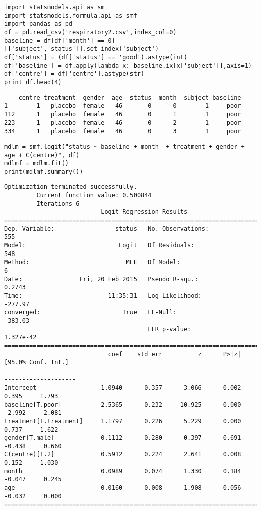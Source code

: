 \documentclass[12pt,fleqn]{article}\usepackage{../common}
\begin{document}
\begin{verbatim}
import statsmodels.api as sm
import statsmodels.formula.api as smf
import pandas as pd
df = pd.read_csv('respiratory2.csv',index_col=0)
baseline = df[df['month'] == 0][['subject','status']].set_index('subject')
df['status'] = (df['status'] == 'good').astype(int)
df['baseline'] = df.apply(lambda x: baseline.ix[x['subject']],axis=1)
df['centre'] = df['centre'].astype(str)
print df.head(4)
\end{verbatim}

\begin{verbatim}
    centre treatment  gender  age  status  month  subject baseline
1        1   placebo  female   46       0      0        1     poor
112      1   placebo  female   46       0      1        1     poor
223      1   placebo  female   46       0      2        1     poor
334      1   placebo  female   46       0      3        1     poor
\end{verbatim}


\begin{verbatim}
mdlm = smf.logit("status ~ baseline + month  + treatment + gender + age + C(centre)", df)
mdlmf = mdlm.fit()
print(mdlmf.summary())
\end{verbatim}

\begin{verbatim}
Optimization terminated successfully.
         Current function value: 0.500844
         Iterations 6
                           Logit Regression Results                           
==============================================================================
Dep. Variable:                 status   No. Observations:                  555
Model:                          Logit   Df Residuals:                      548
Method:                           MLE   Df Model:                            6
Date:                Fri, 20 Feb 2015   Pseudo R-squ.:                  0.2743
Time:                        11:35:31   Log-Likelihood:                -277.97
converged:                       True   LL-Null:                       -383.03
                                        LLR p-value:                 1.327e-42
==========================================================================================
                             coef    std err          z      P>|z|      [95.0% Conf. Int.]
------------------------------------------------------------------------------------------
Intercept                  1.0940      0.357      3.066      0.002         0.395     1.793
baseline[T.poor]          -2.5365      0.232    -10.925      0.000        -2.992    -2.081
treatment[T.treatment]     1.1797      0.226      5.229      0.000         0.737     1.622
gender[T.male]             0.1112      0.280      0.397      0.691        -0.438     0.660
C(centre)[T.2]             0.5912      0.224      2.641      0.008         0.152     1.030
month                      0.0989      0.074      1.330      0.184        -0.047     0.245
age                       -0.0160      0.008     -1.908      0.056        -0.032     0.000
==========================================================================================
\end{verbatim}
\end{document}
